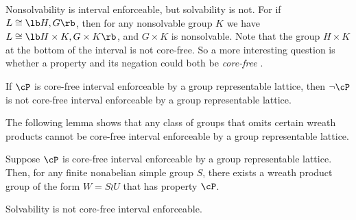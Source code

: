 \begin{frame}[label=IEPropsConjecture]{}
Nonsolvability is interval enforceable, but solvability is not. 
\vskip4mm
For if $L\cong \lb H, G \rb$, then for any nonsolvable 
group $K$ we have $L\cong \lb H\times K, G\times K\rb$, and $G\times K$ is
nonsolvable.  
\vskip4mm
Note that the group $H\times K$ at the bottom of
the interval is not core-free.  So a more interesting question is whether a
property and its negation could both be \emph{core-free} \IE.  
\vskip4mm
\begin{conjecture}
\label{conjecture:isle-prop2}
If $\cP$ is core-free interval enforceable by a group representable lattice,
then $\neg \cP$ is not core-free interval enforceable by a group representable lattice.
\end{conjecture}
\end{frame}

\begin{frame}[label=IEPropsLemma2]{}
The following lemma shows that 
any class of groups that omits certain wreath products cannot be core-free
interval enforceable by a group representable lattice. 
\vskip4mm
\begin{lemma}
Suppose $\cP$ is core-free interval enforceable by a group
representable lattice.   
Then, for any finite nonabelian simple group $S$, there exists a wreath product group
of the form $W = S\wr U$ that has property $\cP$. 
\end{lemma}
\vskip4mm
\begin{corollary}
Solvability is not core-free interval enforceable.
\end{corollary}
\end{frame}

